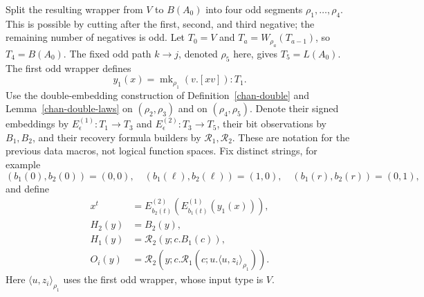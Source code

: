 Split the resulting wrapper from \(V\) to \(B(A_0)\) into
four odd segments \(\rho_1,\ldots,\rho_4\).  This is possible
by cutting after the first, second, and third negative;
the remaining number of negatives is odd.  Let \(T_0=V\) and
\(T_a=W_{\rho_a}(T_{a-1})\), so \(T_4=B(A_0)\).
The fixed odd path \(k\to j\), denoted \(\rho_5\) here, gives
\(T_5=L(A_0)\).  The first odd wrapper defines
\[
 y_1(x)=\operatorname{mk}_{\rho_1}(v.[xv]):T_1.
\]
Use the double-embedding construction of Definition~\ref{chan-double}
and Lemma~\ref{chan-double-laws} on \((\rho_2,\rho_3)\)
and on \((\rho_4,\rho_5)\).  Denote their signed embeddings
by \(E^{(1)}_\epsilon:T_1\to T_3\) and
\(E^{(2)}_\epsilon:T_3\to T_5\), their bit observations by
\(B_1,B_2\), and their recovery formula builders by
\(\mathcal R_1,\mathcal R_2\).  These are notation for the
previous data macros, not logical function spaces.
Fix distinct strings, for example
\[
 (b_1(0),b_2(0))=(0,0),\quad
 (b_1(\ell),b_2(\ell))=(1,0),\quad
 (b_1(r),b_2(r))=(0,1),
\]
and define
\[
\begin{aligned}
 x^t&=E^{(2)}_{b_2(t)}(E^{(1)}_{b_1(t)}(y_1(x))),\\
 H_2(y)&=B_2(y),\\
 H_1(y)&=\mathcal R_2(y;c.B_1(c)),\\
 O_i(y)&=\mathcal R_2
       (y;c.\mathcal R_1(c;u.\langle u,z_i\rangle_{\rho_1})).
\end{aligned}
\]
Here \(\langle u,z_i\rangle_{\rho_1}\) uses the first odd
wrapper, whose input type is \(V\).

